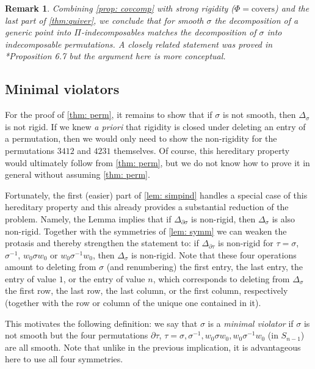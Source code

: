 \documentclass[12pt]{article}
\newtheorem{remark}[theorem]{Remark}
\newcommand{\IM}{\Delta}
\begin{document}
\begin{remark}
Combining \cref{prop: covcomp} with strong rigidity ($\Phi=\text{covers}$) and the last part of
\cref{thm:quiver}, we conclude that for smooth $\sigma$ the decomposition of a generic point into
$\Pi$-indecomposables matches the decomposition of $\sigma$ into indecomposable permutations.
A closely related statement was proved in \cite{MR4847251}*{Proposition 6.7} but the argument here is more conceptual.
\end{remark}

\subsection{Minimal violators}
For the proof of \cref{thm: perm}, it remains to show that if $\sigma$ is not smooth, then $\IM_\sigma$ is not rigid.
If we knew \emph{a priori} that rigidity is closed under deleting an entry of a permutation, then we would only need to show the non-rigidity
for the permutations $3412$ and $4231$ themselves.
Of course, this hereditary property would ultimately follow from \cref{thm: perm}, but we do not know how to prove it in general without assuming
\cref{thm: perm}.

Fortunately, the first (easier) part of \cref{lem: simpind} handles a special case of this hereditary property and this already provides a substantial reduction of the problem.
Namely, the Lemma implies that if $\IM_{\partial\sigma}$ is non-rigid, then $\IM_\sigma$ is also non-rigid.
Together with the symmetries of \cref{lem: symm} we can weaken the protasis and thereby strengthen the statement to: if $\IM_{\partial\tau}$ is non-rigid for
$\tau=\sigma$, $\sigma^{-1}$, $w_0\sigma w_0$ or $w_0\sigma^{-1}w_0$, then $\IM_\sigma$ is non-rigid.
Note that these four operations amount to deleting from $\sigma$ (and renumbering) the first entry, the last entry, the entry
of value $1$, or the entry of value $n$, which corresponds to deleting from $\IM_\sigma$ the first row, the last row, the
last column, or the first column, respectively (together with the row or column of the unique one contained in it).

This motivates the following definition: we say that $\sigma$ is a \emph{minimal violator} if $\sigma$ is not smooth but the four permutations
$\partial\tau$, $\tau=\sigma,\sigma^{-1},w_0\sigma w_0,w_0\sigma^{-1}w_0$ (in $S_{n-1}$) are all smooth.
Note that unlike in the previous implication, it is advantageous here to use all four symmetries.
\end{document}
